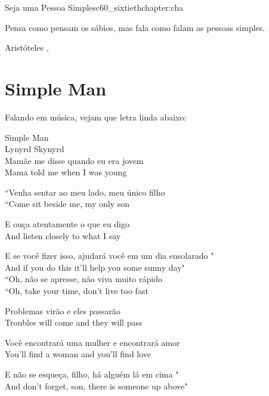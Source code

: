 \begin{chapterpage}{Seja uma Pessoa Simples}{c60_sixtiethchapter:cha}
 
\begin{myquotation}Pensa como pensam os sábios, mas fala como falam as pessoas simples.
\par\vspace*{15mm}
\mbox{}\hfill \emdash{}Aristóteles
, %
\par\end{myquotation}

\end{chapterpage}



\section{Simple Man}\label{c1_basicformatting:sec}

\emdash{}Falando em música, vejam que letra linda abaixo:

Simple Man \\
Lynyrd Skynyrd \\

Mamãe me disse quando eu era jovem \\
Mama told me when I was young

``Venha sentar ao meu lado, meu único filho \\
``Come sit beside me, my only son

E ouça atentamente o que eu digo \\
And listen closely to what I say

E se você fizer isso, ajudará você em um dia ensolarado " \\
And if you do this it'll help you some sunny day" \\
``Oh, não se apresse, não viva muito rápido \\
``Oh, take your time, don't live too fast

Problemas virão e eles passarão \\
Troubles will come and they will pass

Você encontrará uma mulher e encontrará amor \\
You'll find a woman and you'll find love

E não se esqueça, filho, há alguém lá em cima " \\
And don't forget, son, there is someone up above"

